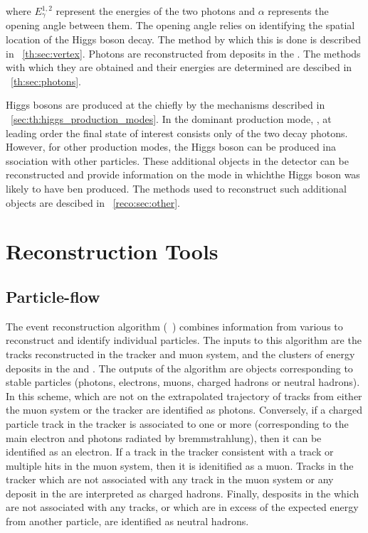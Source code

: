 where $E_{\gamma}^{1,2}$ represent the energies of the two photons and $\alpha$ represents the opening angle between them. The opening angle relies on identifying the spatial location of the Higgs boson decay. The method by which this is done is described in \Sec~\ref{th:sec:vertex}. Photons are reconstructed from deposits in the \CMS \ECAL. The methods with  which they are obtained and their energies are determined are descibed in \Sec~\ref{th:sec:photons}.

Higgs bosons are produced at the \LHC chiefly by the mechanisms described in \Sec~\ref{sec:th:higgs_production_modes}. In the dominant production mode, \ggH, at leading order the final state of interest consists only of the two decay photons. However, for other production modes, the Higgs boson can be produced ina ssociation with other particles. These additional objects in the detector can be reconstructed and provide information on the mode in whichthe Higgs boson was likely to have ben produced. The methods used to reconstruct such additional objects are descibed in \Sec~\ref{reco:sec:other}.

\section{Reconstruction Tools}

\subsection{Particle-flow}
\label{reco:sec:pf}

The \PF event reconstruction algorithm (~\cite{CMS-PAS-PFT-09-001,CMS-PAS-PFT-10-001}) combines information from various \CMS \subdetector\s to reconstruct and identify individual particles. The inputs to this algorithm are the tracks reconstructed in the tracker and muon system, and the clusters of energy deposits in the \ECAL and \HCAL. The outputs of the algorithm are objects corresponding to stable particles (photons, electrons, muons, charged hadrons or neutral hadrons). In this scheme, \ECAL \SC\s which are not on the extrapolated trajectory of tracks from either the muon system or the tracker are identified as photons. Conversely, if a charged particle track in the tracker is associated to one or more \ECAL \SC (corresponding to the main electron and photons radiated by bremmstrahlung), then it can be identified as an electron. If a track in the tracker consistent with a track or multiple hits in the muon system, then it is idenitified as a muon. Tracks in the tracker which are not associated with any track in the muon system or any deposit in the \ECAL are interpreted as charged hadrons. Finally, desposits in the \HCAL which are not associated with any tracks, or which are in excess of the expected \HCAL energy from another \PF particle, are identified as neutral hadrons.

